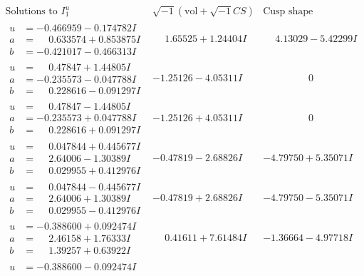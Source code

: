 \documentclass[1p]{elsarticle_modified}
\theoremstyle{definition}
\newcommand{\I}{\sqrt{-1}}
\begin{document}
$$\begin{array}{c|c|c}
\text{Solutions to }I^u_{1}& \I (\text{vol} + \sqrt{-1}CS) & \text{Cusp shape}\\
 \hline 
\begin{aligned}
u &= -0.466959 - 0.174782 I \\
a &= \phantom{-}0.633574 + 0.853875 I \\
b &= -0.421017 - 0.466313 I\end{aligned}
 & \phantom{-}1.65525 + 1.24404 I & \phantom{-}4.13029 - 5.42299 I \\ \hline\begin{aligned}
u &= \phantom{-}0.47847 + 1.44805 I \\
a &= -0.235573 - 0.047788 I \\
b &= \phantom{-}0.228616 - 0.091297 I\end{aligned}
 & -1.25126 - 4.05311 I & \phantom{-0.000000 } 0 \\ \hline\begin{aligned}
u &= \phantom{-}0.47847 - 1.44805 I \\
a &= -0.235573 + 0.047788 I \\
b &= \phantom{-}0.228616 + 0.091297 I\end{aligned}
 & -1.25126 + 4.05311 I & \phantom{-0.000000 } 0 \\ \hline\begin{aligned}
u &= \phantom{-}0.047844 + 0.445677 I \\
a &= \phantom{-}2.64006 - 1.30389 I \\
b &= \phantom{-}0.029955 + 0.412976 I\end{aligned}
 & -0.47819 - 2.68826 I & -4.79750 + 5.35071 I \\ \hline\begin{aligned}
u &= \phantom{-}0.047844 - 0.445677 I \\
a &= \phantom{-}2.64006 + 1.30389 I \\
b &= \phantom{-}0.029955 - 0.412976 I\end{aligned}
 & -0.47819 + 2.68826 I & -4.79750 - 5.35071 I \\ \hline\begin{aligned}
u &= -0.388600 + 0.092474 I \\
a &= \phantom{-}2.46158 + 1.76333 I \\
b &= \phantom{-}1.39257 + 0.63922 I\end{aligned}
 & \phantom{-}0.41611 + 7.61484 I & -1.36664 - 4.97718 I \\ \hline\begin{aligned}
u &= -0.388600 - 0.092474 I \\

\end{aligned}
\end{array}$$
\end{document}
